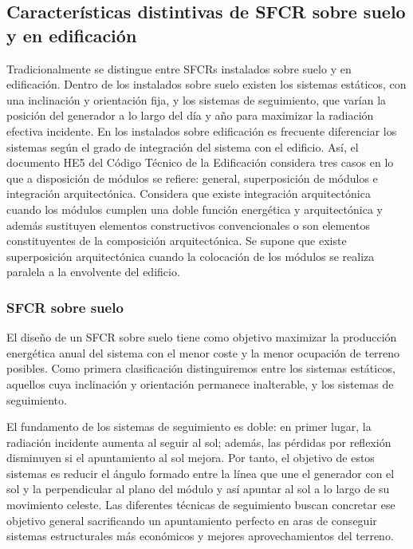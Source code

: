 


\subsection{Características distintivas de SFCR sobre suelo y en edificación}

Tradicionalmente se distingue entre SFCRs instalados sobre suelo y
en edificación. Dentro de los instalados sobre suelo existen los sistemas
estáticos, con una inclinación y orientación fija, y los sistemas
de seguimiento, que varían la posición del generador a lo largo del
día y año para maximizar la radiación efectiva incidente. En los instalados
sobre edificación es frecuente diferenciar los sistemas según el grado
de integración del sistema con el edificio. Así, el documento HE5
del Código Técnico de la Edificación considera tres casos en lo que
a disposición de módulos se refiere: general, superposición de módulos
e integración arquitectónica. Considera que existe integración arquitectónica
cuando los módulos cumplen una doble función energética y arquitectónica
y además sustituyen elementos constructivos convencionales o son elementos
constituyentes de la composición arquitectónica. Se supone que existe
superposición arquitectónica cuando la colocación de los módulos se
realiza paralela a la envolvente del edificio.


\subsubsection{SFCR sobre suelo}

El diseño de un SFCR sobre suelo tiene como objetivo maximizar la
producción energética anual del sistema con el menor coste y la menor
ocupación de terreno posibles. Como primera clasificación distinguiremos
entre los sistemas estáticos, aquellos cuya inclinación y orientación
permanece inalterable, y los sistemas de seguimiento.

El fundamento de los sistemas de seguimiento es doble: en primer lugar,
la radiación incidente aumenta al seguir al sol; además, las pérdidas
por reflexión disminuyen si el apuntamiento al sol mejora. Por tanto,
el objetivo de estos sistemas es reducir el ángulo formado entre la
línea que une el generador con el sol y la perpendicular al plano
del módulo y así apuntar al sol a lo largo de su movimiento celeste.
Las diferentes técnicas de seguimiento buscan concretar ese objetivo
general sacrificando un apuntamiento perfecto en aras de conseguir
sistemas estructurales más económicos y mejores aprovechamientos del
terreno. 

